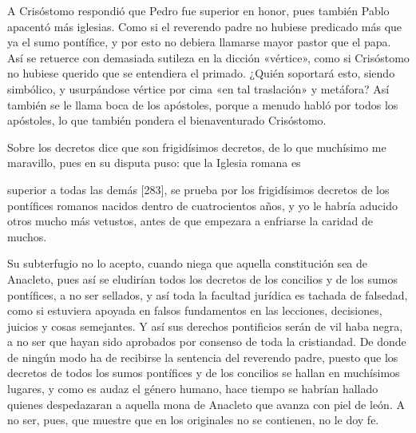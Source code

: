 A Crisóstomo respondió que Pedro fue superior en honor, pues también Pablo apacentó más iglesias. Como si el reverendo padre no hubiese predicado más que ya el sumo pontífice, y por esto no debiera llamarse mayor pastor que el papa. Así se retuerce con demasiada sutileza en la dicción «vértice», como si Crisóstomo no hubiese querido que se entendiera el primado. ¿Quién soportará esto, siendo simbólico, y usurpándose vértice por cima «en tal traslación» y metáfora? Así también se le llama boca de los apóstoles, porque a menudo habló por todos los apóstoles, lo que también pondera el bienaventurado Crisóstomo.

Sobre los decretos dice que son frigidísimos decretos, de lo que muchísimo me maravillo, pues en su disputa puso: que la Iglesia romana es

superior a todas las demás [283], se prueba por los frigidísimos decretos de los pontífices romanos nacidos dentro de cuatrocientos años, y yo le habría aducido otros mucho más vetustos, antes de que empezara a enfriarse la caridad de muchos.

Su subterfugio no lo acepto, cuando niega que aquella constitución sea de Anacleto, pues así se eludirían todos los decretos de los concilios y de los sumos pontífices, a no ser sellados, y así toda la facultad jurídica es tachada de falsedad, como si estuviera apoyada en falsos fundamentos en las lecciones, decisiones, juicios y cosas semejantes. Y así sus derechos pontificios serán de vil haba negra, a no ser que hayan sido aprobados por consenso de toda la cristiandad. De donde de ningún modo ha de recibirse la sentencia del reverendo padre, puesto que los decretos de todos los sumos pontífices y de los concilios se hallan en muchísimos lugares, y como es audaz el género humano, hace tiempo se habrían hallado quienes despedazaran a aquella mona de Anacleto que avanza con piel de león. A no ser, pues, que muestre que en los originales no se contienen, no le doy fe.

